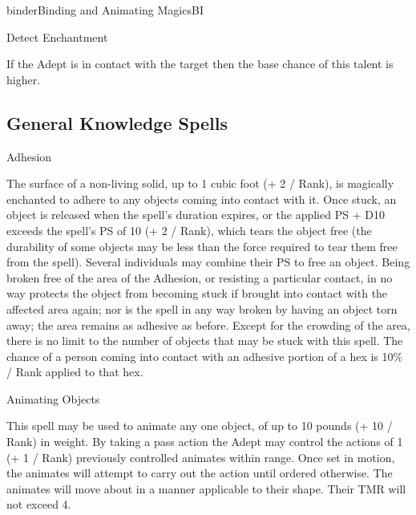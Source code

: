 \begin{college}[1.1]{binder}{Binding and Animating Magics}{BI}
\begin{talent}[T-2]{Detect Enchantment}
\begin{effects}
If the Adept is in contact with the target then the base chance of
this talent is higher.
\end{effects}
\end{talent}

\subsection{General Knowledge Spells}


\begin{spell}[G-1]{Adhesion}

\begin{effects}
The surface of a non-living solid, up to 1 cubic foot (+ 2 / Rank), is
magically enchanted to adhere to any objects coming into contact with
it. Once stuck, an object is released when the spell's duration
expires, or the applied PS + D10 exceeds the spell's PS of 10 (+ 2 /
Rank), which tears the object free (the durability of some objects may
be less than the force required to tear them free from the
spell). Several individuals may combine their PS to free an
object. Being broken free of the area of the Adhesion, or resisting a
particular contact, in no way protects the object from becoming stuck
if brought into contact with the affected area again; nor is the spell
in any way broken by having an object torn away; the area remains as
adhesive as before. Except for the crowding of the area, there is no
limit to the number of objects that may be stuck with this spell. The
chance of a person coming into contact with an adhesive portion of a
hex is 10\% / Rank applied to that hex.
\end{effects}
\end{spell}

\begin{spell}[G-2]{Animating Objects}

\begin{effects}
This spell may be used to animate any one object, of up to 10 pounds
(+ 10 / Rank) in weight. By taking a pass action the Adept may control
the actions of 1 (+ 1 / Rank) previously controlled animates within
range. Once set in motion, the animates will attempt to carry out the
action until ordered otherwise. The animates will move about in a
manner applicable to their shape. Their TMR will not exceed 4.


\end{effects}
\end{spell}
\end{college}
